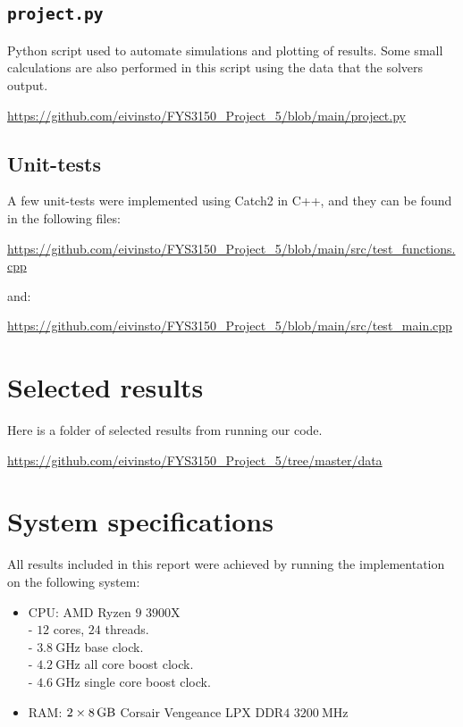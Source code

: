 \documentclass[reprint,english,notitlepage]{revtex4-1}  %
\begin{document}
\cprotect\subsection{\verb+project.py+} \label{A.6} 

Python script used to automate simulations and plotting of results. Some small calculations are also performed in this script using the data that the solvers output. 


\url{https://github.com/eivinsto/FYS3150_Project_5/blob/main/project.py}


\cprotect\subsection{Unit-tests} \label{A.7}

A few unit-tests were implemented using Catch2 in C++, and they can be found in the following files:

\url{https://github.com/eivinsto/FYS3150_Project_5/blob/main/src/test_functions.cpp}

and:

\url{https://github.com/eivinsto/FYS3150_Project_5/blob/main/src/test_main.cpp} 

\clearpage
\section{Selected results} \label{B}
Here is a folder of selected results from running our code.

\url{https://github.com/eivinsto/FYS3150_Project_5/tree/master/data}

\newpage
\section{System specifications} \label{C}
All results included in this report were achieved by running the implementation on the following system:

\begin{itemize}
	\item CPU: AMD Ryzen \(9\) \(3900\)X \\
		- \(12\) cores, \(24\) threads. \\ 
		- \(\SI{3.8}{\giga\hertz}\) base clock. \\
		- \(\SI{4.2}{\giga\hertz}\) all core boost clock. \\
		- \(\SI{4.6}{\giga\hertz}\) single core boost clock. \\
	\item RAM: \(2\times\SI{8}{\giga\byte}\) Corsair Vengeance LPX DDR\(4\) \(\SI{3200}{\mega\hertz}\)
\end{itemize}
\end{document}
